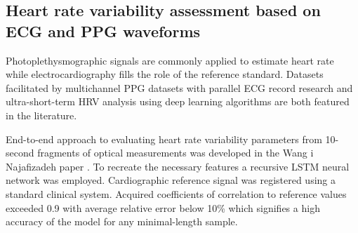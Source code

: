 \documentclass[journal]{IEEEtran}
\begin{document}
\subsection{Heart rate variability assessment based on ECG and PPG waveforms}
Photoplethysmographic signals are commonly applied to estimate heart rate while electrocardiography fills the role of the reference standard. Datasets facilitated by multichannel PPG datasets with parallel ECG record research and ultra-short-term HRV analysis using deep learning algorithms are both featured in the literature.

End-to-end approach to evaluating heart rate variability parameters from 10-second fragments of optical measurements was developed in the Wang i Najafizadeh paper \cite{17}. To recreate the necessary features a recursive LSTM neural network was employed. Cardiographic reference signal was registered using a standard clinical system. Acquired coefficients of correlation to reference values exceeded 0.9 with average relative error below 10\% which signifies a high accuracy of the model for any minimal-length sample.
\end{document}

